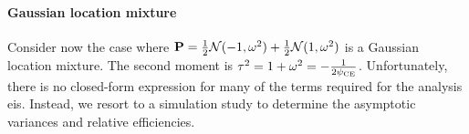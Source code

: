 \begin{example}
    \paragraph{Gaussian location mixture}
    Consider now the case where $\P = \frac{1}{2} \mathcal N(-1, \omega^{2}) + \frac{1}{2}\mathcal N(1, \omega^{2})$ is a Gaussian location mixture. The second moment is $\tau^{2} = 1 + \omega^{2} = -\frac{1}{2\pce}$. Unfortunately, there is no closed-form expression for many of the terms required for the analysis \gls{eis}. Instead, we resort to a simulation study to determine the asymptotic variances and relative efficiencies.

    
\end{example}

